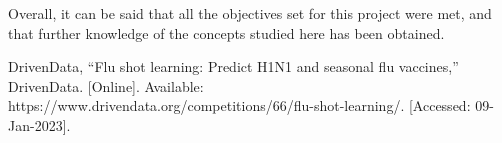 \documentclass{IEEEtran}
\begin{document}
Overall, it can be said that all the objectives set for this project were met, and that further knowledge of the concepts studied here has been obtained.


\begin{thebibliography}{00}
     DrivenData, “Flu shot learning: Predict H1N1 and seasonal flu vaccines,” DrivenData. [Online]. Available: https://www.drivendata.org/competitions/66/flu-shot-learning/. [Accessed: 09-Jan-2023].

\end{thebibliography}
\end{document}

